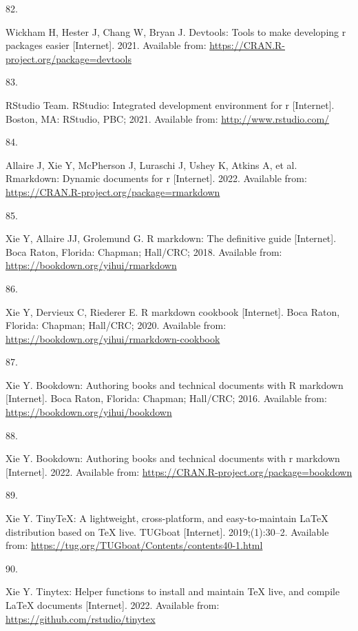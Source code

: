 \documentclass[10pt,a4paper]{article}
\newlength{\cslhangindent}
\newlength{\csllabelwidth}
\newlength{\cslentryspacingunit} %
\newenvironment{CSLReferences}[2] %
 {%
  \setlength{\parindent}{0pt}
  \ifodd #1
  \let\oldpar\par
  \def\par{\hangindent=\cslhangindent\oldpar}
  \fi
  \setlength{\parskip}{#2\cslentryspacingunit}
 }%
 {}
\newcommand{\CSLLeftMargin}[1]{\parbox[t]{\csllabelwidth}{#1}}
\newcommand{\CSLRightInline}[1]{\parbox[t]{\linewidth - \csllabelwidth}{#1}\break}
\begin{document}
\begin{CSLReferences}{0}{0}
\leavevmode{}%
\CSLLeftMargin{82. }
\CSLRightInline{Wickham H, Hester J, Chang W, Bryan J. Devtools: Tools to make developing r packages easier {[}Internet{]}. 2021. Available from: \url{https://CRAN.R-project.org/package=devtools}}

\leavevmode{}%
\CSLLeftMargin{83. }
\CSLRightInline{RStudio Team. RStudio: Integrated development environment for r {[}Internet{]}. Boston, MA: RStudio, PBC; 2021. Available from: \url{http://www.rstudio.com/}}

\leavevmode{}%
\CSLLeftMargin{84. }
\CSLRightInline{Allaire J, Xie Y, McPherson J, Luraschi J, Ushey K, Atkins A, et al. Rmarkdown: Dynamic documents for r {[}Internet{]}. 2022. Available from: \url{https://CRAN.R-project.org/package=rmarkdown}}

\leavevmode{}%
\CSLLeftMargin{85. }
\CSLRightInline{Xie Y, Allaire JJ, Grolemund G. R markdown: The definitive guide {[}Internet{]}. Boca Raton, Florida: Chapman; Hall/CRC; 2018. Available from: \url{https://bookdown.org/yihui/rmarkdown}}

\leavevmode{}%
\CSLLeftMargin{86. }
\CSLRightInline{Xie Y, Dervieux C, Riederer E. R markdown cookbook {[}Internet{]}. Boca Raton, Florida: Chapman; Hall/CRC; 2020. Available from: \url{https://bookdown.org/yihui/rmarkdown-cookbook}}

\leavevmode{}%
\CSLLeftMargin{87. }
\CSLRightInline{Xie Y. Bookdown: Authoring books and technical documents with {R} markdown {[}Internet{]}. Boca Raton, Florida: Chapman; Hall/CRC; 2016. Available from: \url{https://bookdown.org/yihui/bookdown}}

\leavevmode{}%
\CSLLeftMargin{88. }
\CSLRightInline{Xie Y. Bookdown: Authoring books and technical documents with r markdown {[}Internet{]}. 2022. Available from: \url{https://CRAN.R-project.org/package=bookdown}}

\leavevmode{}%
\CSLLeftMargin{89. }
\CSLRightInline{Xie Y. TinyTeX: A lightweight, cross-platform, and easy-to-maintain LaTeX distribution based on TeX live. TUGboat {[}Internet{]}. 2019;(1):30--2. Available from: \url{https://tug.org/TUGboat/Contents/contents40-1.html}}

\leavevmode{}%
\CSLLeftMargin{90. }
\CSLRightInline{Xie Y. Tinytex: Helper functions to install and maintain TeX live, and compile LaTeX documents {[}Internet{]}. 2022. Available from: \url{https://github.com/rstudio/tinytex}}


\end{CSLReferences}
\end{document}

